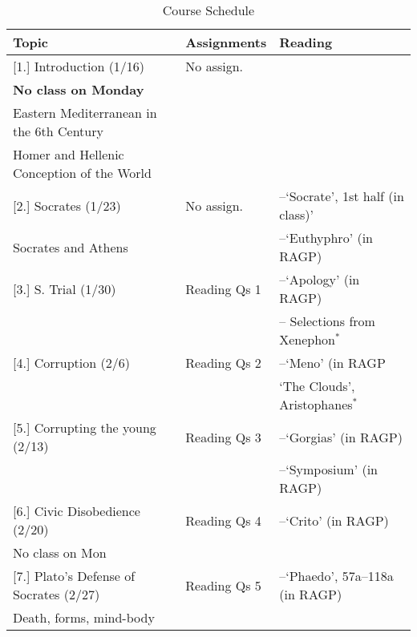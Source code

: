 \documentclass[article,oneside]{memoir}
\begin{document}
\newpage
\begin{landscape}
\begin{center}
\begin{longtable}{p{8cm}p{4cm}p{8cm}}
 
  \caption{Course Schedule} \\
  \toprule
  \textbf{Topic}   & \textbf{Assignments} & \textbf{Reading} \\
  \midrule

  
[1.] Introduction (1/16) 						& No assign.		&  \\ 
\textbf{No class on Monday}					&				& \\
Eastern Mediterranean in the 6th Century			&				& \\
Homer and Hellenic Conception of the World		 &				&    \\ [1.8\baselineskip] \hline

[2.] Socrates (1/23)	  			&  No assign.			& --`Socrate', 1st half (in class)'  \\
Socrates and Athens				&					 & --`Euthyphro'  (in RAGP)  \\ [1.8\baselineskip] \hline



[3.] S. Trial (1/30)				& Reading Qs 1		& --`Apology' (in RAGP)  \\ 
							&					& -- Selections from Xenephon$^{*}$\\[1.8\baselineskip]  \hline %


[4.] Corruption (2/6)					& Reading Qs 2		&  --`Meno' (in RAGP \\
			    	    				& 					&  `The Clouds', Aristophanes$^{*}$	 \\ [1.8\baselineskip]  \hline 

[5.] Corrupting the young (2/13)			& Reading Qs 3		&  --`Gorgias' (in RAGP) \\
						      		& 					&  --`Symposium' (in RAGP)  \\ [1.8\baselineskip]  \hline 

[6.] Civic Disobedience (2/20)			& Reading Qs 4		&  --`Crito' (in RAGP) \\
No class on Mon					& 					&  \\ [1.8\baselineskip]  \hline 


[7.] Plato's Defense of Socrates (2/27)		& Reading Qs 5				& --`Phaedo', 57a--118a (in RAGP)	 \\
Death, forms, mind-body					                                  & 							&  \\ [1.8\baselineskip]  \hline


\end{longtable}
\end{center}
\end{landscape}
\end{document}
